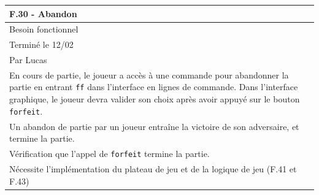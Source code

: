 \documentclass[a4paper,12pt]{article}
\begin{document}
\vspace{1cm}

\noindent
\setlength{\arrayrulewidth}{1.5pt}
\renewcommand{\arraystretch}{1.5}
\begin{tabularx}{\textwidth}{|X|}
    \hline
    \textbf{F.30 - Abandon}                                                                                                                                                                                                                                        \\
    \hline
    Besoin fonctionnel                                                                                                                                                                                                                                             \\
    \hline
    Terminé le 12/02                                                                                                                                                                                                                                               \\
    Par Lucas                                                                                                                                                                                                                                                      \\
    \hline
    En cours de partie, le joueur a accès à une commande pour abandonner la partie en entrant \texttt{ff} dans l’interface en lignes de commande. Dans l’interface graphique, le joueur devra valider son choix après avoir appuyé sur le bouton \texttt{forfeit}. \\
    Un abandon de partie par un joueur entraîne la victoire de son adversaire, et termine la partie.                                                                                                                                                               \\
    \arrayrulecolor{MediumAquamarine}\hline
    \arrayrulecolor{CornflowerBlue}
    Vérification que l’appel de \texttt{forfeit} termine la partie.                                                                                                                                                                                                \\
    \arrayrulecolor{MediumAquamarine}\hline
    \arrayrulecolor{CornflowerBlue}
    Nécessite l'implémentation du plateau de jeu et de la logique de jeu (F.41 et F.43)                                                                                                                                                                            \\
    \hline
\end{tabularx}
\end{document}
